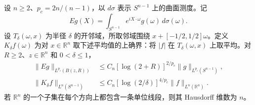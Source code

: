 设 \(n\ge2\)、\(p_c=2n/(n-1)\)，以 \(d\sigma\) 表示 \(S^{n-1}\) 上的曲面测度。记
\[
 Eg(X)=\int_{S^{n-1}} e^{iX\cdot\omega}g(\omega)\,d\sigma(\omega).
\]
设 \(T_\delta(\omega,x)\) 为半径 \(\delta\) 的开邻域，所取邻域围绕 \(x+[-1/2,1/2]\omega\)。定义 \(K_\delta f(\omega)\) 为对 \(x\in\mathbb R^n\) 取下述平均值的上确界：将 \(|f|\) 在 \(T_\delta(\omega,x)\) 上取平均。对 \(R\ge2\)、\(z\in\mathbb R^n\) 和 \(0<\delta\le1\)，
\[
\begin{aligned}
 \|Eg\|_{L^{p_c}(B(z,R))}&\le C_n[\log(2+R)]^{2/p_c}\|g\|_{L^{p_c}(S^{n-1})},\\
 \|K_\delta f\|_{L^n(S^{n-1})}&\le C_n[\log(2/\delta)]^{4/p_c}\|f\|_{L^n(\mathbb R^n)}.
\end{aligned}
\]
若 \(\mathbb R^n\) 的一个子集在每个方向上都包含一条单位线段，则其 Hausdorff 维数为 \(n\)。
